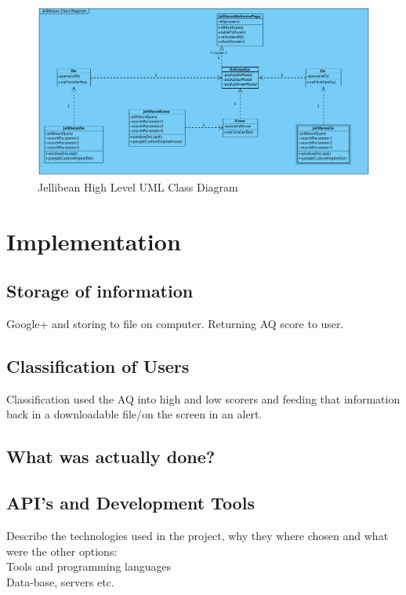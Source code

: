\documentclass[a4paper, 11pt]{article}
\begin{document}
\begin{figure}[H]
\begin{center}
\includegraphics[scale=0.45]{jBeanClassDiagram}
\caption{Jellibean High Level UML Class Diagram}
\label{jBeanClassDiagram1}
\end{center}
\end{figure}




\section{Implementation}

\subsection{Storage of information}
Google+ and storing to file on computer.
Returning AQ score to user.


\subsection{Classification of Users}
Classification used the AQ into high and low scorers and feeding that information back in a downloadable file/on the screen in an alert.



\subsection{What was actually done?}

\subsection{API's and Development Tools}
Describe the technologies used in the project, why they where
chosen and what were the other options:\\
Tools and programming languages\\
Data-base, servers etc.
\end{document}
